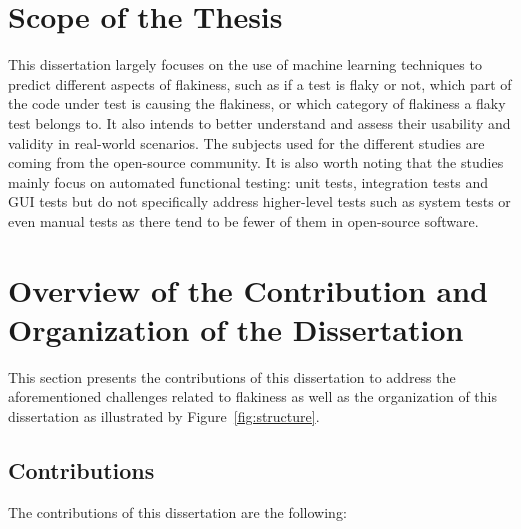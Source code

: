 \section{Scope of the Thesis}

This dissertation largely focuses on the use of machine learning techniques to predict different aspects of flakiness, such as if a test is flaky or not, which part of the code under test is causing the flakiness, or which category of flakiness a flaky test belongs to. It also intends to better understand and assess their usability and validity in real-world scenarios. The subjects used for the different studies are coming from the open-source community. It is also worth noting that the studies mainly focus on automated functional testing: unit tests, integration tests and GUI tests but do not specifically address higher-level tests such as system tests or even manual tests as there tend to be fewer of them in open-source software.

\section{Overview of the Contribution and Organization of the Dissertation}

This section presents the contributions of this dissertation to address the aforementioned challenges related to flakiness as well as the organization of this dissertation as illustrated by Figure~\ref{fig:structure}. 

\subsection{Contributions}

The contributions of this dissertation are the following:

